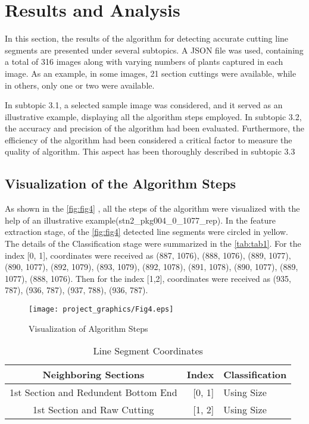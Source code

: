 \documentclass[]{iat}
\begin{document}
\chapter{Results and Analysis}

In this section, the results of the algorithm for detecting accurate cutting line segments are presented under several subtopics. A JSON file was used, containing a total of 316 images along with varying numbers of plants captured in each image. As an example, in some images, 21 section cuttings were available, while in others, only one or two were available. 
\par
In subtopic 3.1, a selected sample image was considered, and it served as an illustrative example, displaying all the algorithm steps employed. In subtopic 3.2, the accuracy and precision of the algorithm had been evaluated. Furthermore, the efficiency of the algorithm had been considered a critical factor to measure the quality of algorithm. This aspect has been thoroughly described in subtopic 3.3
\par

\section{Visualization of the Algorithm Steps}

As shown in the \autoref{fig:fig4} , all the steps of the algorithm were visualized with the help of an illustrative example(stn2\_pkg004\_0\_1077\_rep). In the feature extraction stage, of the \autoref{fig:fig4} detected line segments were circled in yellow. The details of the  Classification stage were summarized in the \autoref{tab:tab1}. For the index [0, 1], coordinates were received as (887, 1076), (888, 1076), (889, 1077), (890, 1077), (892, 1079), (893, 1079), (892, 1078), (891, 1078), (890, 1077), (889, 1077), (888, 1076). Then for the index [1,2], coordinates were received as (935, 787), (936, 787), (937, 788), (936, 787). 

\par
\FloatBarrier
\begin{figure}[h]
    
	\texttt{[image: project\_graphics/Fig4.eps]}
	\caption{Visualization of Algorithm Steps}
	\label{fig:fig4}
\end{figure}

\FloatBarrier
\begin{table}[h]
\begin{tabular}{crl}
\hline
Neighboring Sections & Index & Classification\\\hline
1st Section and Redundent Bottom End & [0, 1] & Using Size \\
1st Section and Raw Cutting & [1, 2] & Using Size \\\hline
\end{tabular}
\caption{Line Segment Coordinates}
\label{tab:tab1}
\end{table}
\end{document}
